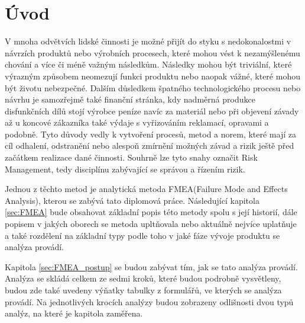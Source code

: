 \chapter{Úvod}
\label{sec:Uvod}
V mnoha odvětvích lidské činnosti je možné přijít do styku s nedokonalostmi v návrzích produktů nebo výrobních procesech, které mohou vést k nezamýšlenému chování a více či méně važným následkům. Následky mohou být triviální, které výrazným způsobem neomezují funkci produktu nebo naopak vážné, které mohou být životu nebezpečné. Dalším důsledkem špatného technologického procesu nebo návrhu je samozřejmě také finanční stránka, kdy nadměrná produkce disfunkčních dílů stojí výrobce peníze navíc za materiál nebo při objevení závady až u koncové zákazníka také výdaje s vyřizováním reklamací, opravami a podobně. Tyto důvody vedly k vytvoření procesů, metod a norem, které mají za cíl odhalení, odstranění nebo alespoň zmírnění možných závad a rizik ještě před začátkem realizace dané činnosti. Souhrně lze tyto snahy označit Risk Management, tedy disciplínu zabývající se správou a řízením rizik. 

Jednou z těchto metod je analytická metoda FMEA(Failure Mode and Effects Analysis), kterou se zabývá tato diplomová práce. Následující kapitola  \ref{sec:FMEA} bude obsahovat základní popis této metody spolu s její historií, dále popisem v jakých oborech se metoda upltňovala nebo aktuálně nejvíce uplatňuje a také rozdělení na základní typy podle toho v jaké fáze vývoje produktu se analýza provádí.

Kapitola \ref{sec:FMEA_postup} se budou zabývat tím, jak se tato analýza provádí. Analýza se skládá celkem ze sedmi kroků, které budou podrobně vysvětleny, budou zde také uvedeny výňatky tabulky z formulářů, ve kterých se analýza provádí. Na jednotlivých krocích analýzy budou zobrazeny odlišnosti dvou typů analýz, na které je kapitola zaměřena. 


\endinput